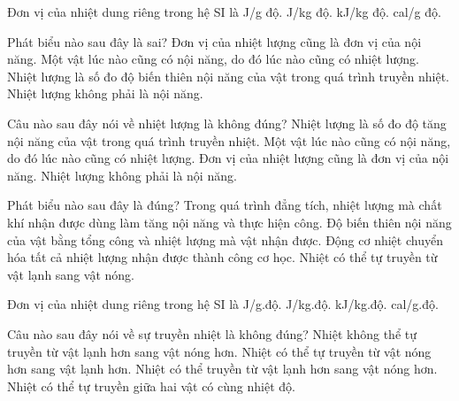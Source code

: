 \begin{ex}
Đơn vị của nhiệt dung riêng trong hệ SI là
\choice
{J/g độ.}
{\True J/kg độ.}
{kJ/kg độ.}
{cal/g độ.}
\end{ex}

\begin{ex}
Phát biểu nào sau đây là sai?
\choice
{Đơn vị của nhiệt lượng cũng là đơn vị của nội năng.}
{\True Một vật lúc nào cũng có nội năng, do đó lúc nào cũng có nhiệt lượng.}
{Nhiệt lượng là số đo độ biến thiên nội năng của vật trong quá trình truyền nhiệt.}
{Nhiệt lượng không phải là nội năng.}
\end{ex}

\begin{ex}
Câu nào sau đây nói về nhiệt lượng là không đúng?
\choice
{Nhiệt lượng là số đo độ tăng nội năng của vật trong quá trình truyền nhiệt.}
{\True Một vật lúc nào cũng có nội năng, do đó lúc nào cũng có nhiệt lượng.}
{Đơn vị của nhiệt lượng cũng là đơn vị của nội năng.}
{Nhiệt lượng không phải là nội năng.}
\end{ex}

\begin{ex}
Phát biểu nào sau đây là đúng?
\choice
{Trong quá trình đẳng tích, nhiệt lượng mà chất khí nhận được dùng làm tăng nội năng và thực hiện công.}
{\True Độ biến thiên nội năng của vật bằng tổng công và nhiệt lượng mà vật nhận được.}
{Động cơ nhiệt chuyển hóa tất cả nhiệt lượng nhận được thành công cơ học.}
{Nhiệt có thể tự truyền từ vật lạnh sang vật nóng.}
\end{ex}

\begin{ex}
Đơn vị của nhiệt dung riêng trong hệ SI là
\choice
{J/g.độ.}
{\True J/kg.độ.}
{kJ/kg.độ.}
{cal/g.độ.}
\end{ex}

\begin{ex}
Câu nào sau đây nói về sự truyền nhiệt là không đúng?
\choice
{Nhiệt không thể tự truyền từ vật lạnh hơn sang vật nóng hơn.}
{Nhiệt có thể tự truyền từ vật nóng hơn sang vật lạnh hơn.}
{Nhiệt có thể truyền từ vật lạnh hơn sang vật nóng hơn.}
{\True Nhiệt có thể tự truyền giữa hai vật có cùng nhiệt độ.}
\end{ex}

